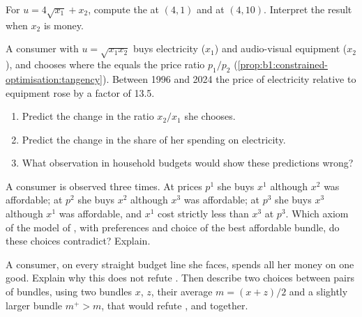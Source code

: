 \begin{exercise}[$\star\star$]\label{exo:b1:preferences-and-utility:quasi}
For $u = 4\sqrt{x_1} + x_2$, compute the  at $(4, 1)$ and at $(4, 10)$.
Interpret the result when $x_2$ is money.
\end{exercise}

\begin{exercise}[$\star\star$]\label{exo:b1:preferences-and-utility:predict}
A consumer with $u = \sqrt{x_1x_2}$ buys electricity ($x_1$) and audio-visual
equipment ($x_2$), and chooses where the  equals the price ratio
$p_1/p_2$ (\cref{prop:b1:constrained-optimisation:tangency}). Between 1996
and 2024 the price of electricity relative to equipment rose by a factor of
13.5. %
\begin{enumerate}
  \item Predict the change in the ratio $x_2/x_1$ she chooses.
  \item Predict the change in the share of her spending on electricity.
  \item What observation in household budgets would show these predictions wrong?
\end{enumerate}
\end{exercise}

\begin{exercise}[$\star\star$]\label{exo:b1:preferences-and-utility:cycle}
A consumer is observed three times. At prices $p^1$ she buys $x^1$ although
$x^2$ was affordable; at $p^2$ she buys $x^2$ although $x^3$ was affordable;
at $p^3$ she buys $x^3$ although $x^1$ was affordable, and $x^1$ cost strictly
less than $x^3$ at $p^3$. Which axiom of the model of , with
 preferences and choice of the best affordable bundle, do these
choices contradict? Explain.
\end{exercise}

\begin{exercise}[$\star\star$]\label{exo:b1:preferences-and-utility:refute-convex}
A consumer, on every straight budget line she faces, spends all her money
on one good. Explain why this does not refute . Then
describe two choices between pairs of bundles, using two bundles $x$, $z$,
their average $m = (x + z)/2$ and a slightly larger bundle $m^{+} > m$,
that would refute ,  and  together.
\end{exercise}

